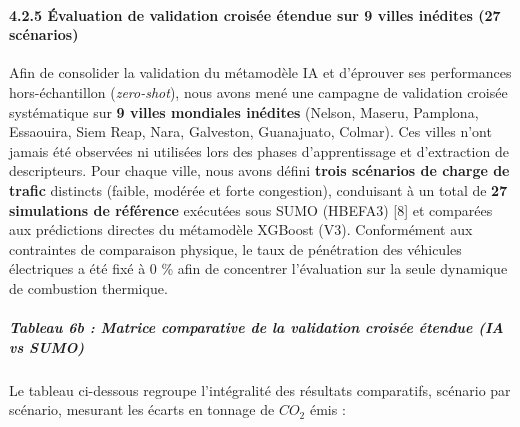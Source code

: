 \documentclass[10pt, a4paper]{article}
\begin{document}
\paragraph{4.2.5 Évaluation de validation croisée étendue sur 9 villes
inédites (27
scénarios)}\label{uxe9valuation-de-validation-croisuxe9e-uxe9tendue-sur-9-villes-inuxe9dites-27-scuxe9narios}

Afin de consolider la validation du métamodèle IA et d'éprouver ses
performances hors-échantillon (\emph{zero-shot}), nous avons mené une
campagne de validation croisée systématique sur \textbf{9 villes
mondiales inédites} (Nelson, Maseru, Pamplona, Essaouira, Siem Reap,
Nara, Galveston, Guanajuato, Colmar). Ces villes n'ont jamais été
observées ni utilisées lors des phases d'apprentissage et d'extraction
de descripteurs. Pour chaque ville, nous avons défini \textbf{trois
scénarios de charge de trafic} distincts (faible, modérée et forte
congestion), conduisant à un total de \textbf{27 simulations de
référence} exécutées sous SUMO (HBEFA3) {[}8{]} et comparées aux
prédictions directes du métamodèle XGBoost (V3). Conformément aux
contraintes de comparaison physique, le taux de pénétration des
véhicules électriques a été fixé à 0 \% afin de concentrer l'évaluation
sur la seule dynamique de combustion thermique.

\subparagraph{Tableau 6b : Matrice comparative de la validation croisée
étendue (IA vs
SUMO)}\label{tableau-6b-matrice-comparative-de-la-validation-croisuxe9e-uxe9tendue-ia-vs-sumo}

Le tableau ci-dessous regroupe l'intégralité des résultats comparatifs,
scénario par scénario, mesurant les écarts en tonnage de \(CO_2\) émis :
\end{document}
